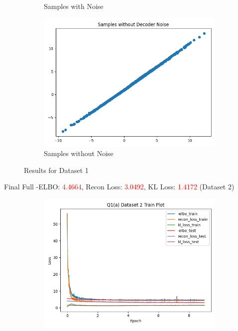 \documentclass{article}
\begin{document}
\begin{enumerate}[(a)]
\begin{figure}[H]
\begin{subfigure}{0.32\textwidth}
        \caption{Samples with Noise}
    \end{subfigure}
    \begin{subfigure}{0.32\textwidth}
        \centering
        \includegraphics[width=\textwidth]{figures/q1_a_dset1_sample_without_noise.png}
        \caption{Samples without Noise}
    \end{subfigure}
    \caption{Results for Dataset 1}
\end{figure}
Final Full -ELBO: \textcolor{red}{4.4664}, Recon Loss: \textcolor{red}{3.0492}, KL Loss: \textcolor{red}{1.4172} (Dataset 2)
\begin{figure}[H]
    \centering
    \begin{subfigure}{0.32\textwidth}
        \centering
        \includegraphics[width=\textwidth]{figures/q1_a_dset2_train_plot.png}

\end{subfigure}
\end{figure}
\end{enumerate}
\end{document}
